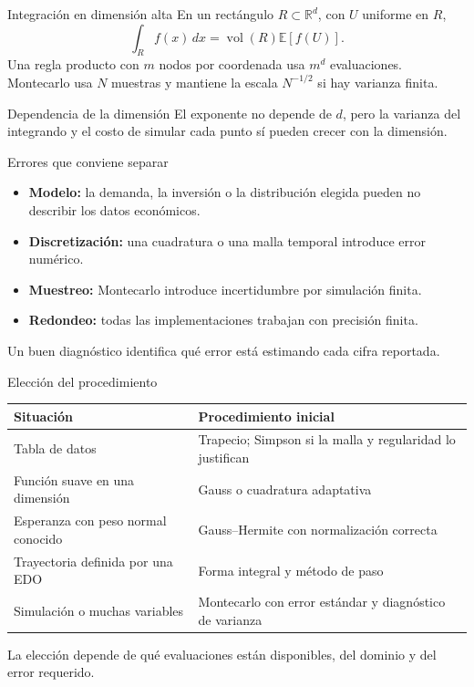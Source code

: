 \documentclass[aspectratio=169,12pt]{beamer}
\newcommand{\R}{\mathbb{R}}
\begin{document}
\begin{frame}{Integración en dimensión alta}
En un rectángulo $R\subset\R^d$, con $U$ uniforme en $R$,
\[\int_R f(x)\,dx=\operatorname{vol}(R)\mathbb E[f(U)].\]
Una regla producto con $m$ nodos por coordenada usa $m^d$ evaluaciones.
Montecarlo usa $N$ muestras y mantiene la escala $N^{-1/2}$ si hay varianza finita.
\begin{block}{Dependencia de la dimensión}
El exponente no depende de $d$, pero la varianza del integrando y el costo de
simular cada punto sí pueden crecer con la dimensión.
\end{block}
\end{frame}

\begin{frame}{Errores que conviene separar}
\begin{itemize}
\item \textbf{Modelo:} la demanda, la inversión o la distribución elegida pueden
no describir los datos económicos.
\item \textbf{Discretización:} una cuadratura o una malla temporal introduce error numérico.
\item \textbf{Muestreo:} Montecarlo introduce incertidumbre por simulación finita.
\item \textbf{Redondeo:} todas las implementaciones trabajan con precisión finita.
\end{itemize}
Un buen diagnóstico identifica qué error está estimando cada cifra reportada.
\end{frame}

\begin{frame}{Elección del procedimiento}
\small
\begin{center}\begin{tabular}{p{.43\linewidth}p{.48\linewidth}}\toprule
Situación&Procedimiento inicial\\\midrule
Tabla de datos&Trapecio; Simpson si la malla y regularidad lo justifican\\[1mm]
Función suave en una dimensión&Gauss o cuadratura adaptativa\\[1mm]
Esperanza con peso normal conocido&Gauss--Hermite con normalización correcta\\[1mm]
Trayectoria definida por una EDO&Forma integral y método de paso\\[1mm]
Simulación o muchas variables&Montecarlo con error estándar y diagnóstico de varianza\\\bottomrule
\end{tabular}\end{center}
La elección depende de qué evaluaciones están disponibles, del dominio y del error requerido.
\end{frame}
\end{document}
